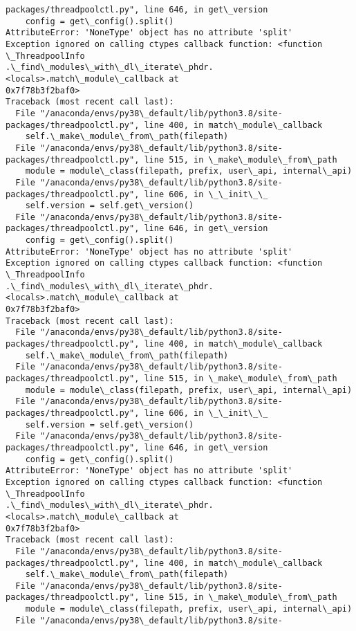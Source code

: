 \documentclass[11pt]{article}
\begin{document}
\begin{Verbatim}[commandchars=\\\{\}]
packages/threadpoolctl.py", line 646, in get\_version
    config = get\_config().split()
AttributeError: 'NoneType' object has no attribute 'split'
Exception ignored on calling ctypes callback function: <function \_ThreadpoolInfo
.\_find\_modules\_with\_dl\_iterate\_phdr.<locals>.match\_module\_callback at
0x7f78b3f2baf0>
Traceback (most recent call last):
  File "/anaconda/envs/py38\_default/lib/python3.8/site-
packages/threadpoolctl.py", line 400, in match\_module\_callback
    self.\_make\_module\_from\_path(filepath)
  File "/anaconda/envs/py38\_default/lib/python3.8/site-
packages/threadpoolctl.py", line 515, in \_make\_module\_from\_path
    module = module\_class(filepath, prefix, user\_api, internal\_api)
  File "/anaconda/envs/py38\_default/lib/python3.8/site-
packages/threadpoolctl.py", line 606, in \_\_init\_\_
    self.version = self.get\_version()
  File "/anaconda/envs/py38\_default/lib/python3.8/site-
packages/threadpoolctl.py", line 646, in get\_version
    config = get\_config().split()
AttributeError: 'NoneType' object has no attribute 'split'
Exception ignored on calling ctypes callback function: <function \_ThreadpoolInfo
.\_find\_modules\_with\_dl\_iterate\_phdr.<locals>.match\_module\_callback at
0x7f78b3f2baf0>
Traceback (most recent call last):
  File "/anaconda/envs/py38\_default/lib/python3.8/site-
packages/threadpoolctl.py", line 400, in match\_module\_callback
    self.\_make\_module\_from\_path(filepath)
  File "/anaconda/envs/py38\_default/lib/python3.8/site-
packages/threadpoolctl.py", line 515, in \_make\_module\_from\_path
    module = module\_class(filepath, prefix, user\_api, internal\_api)
  File "/anaconda/envs/py38\_default/lib/python3.8/site-
packages/threadpoolctl.py", line 606, in \_\_init\_\_
    self.version = self.get\_version()
  File "/anaconda/envs/py38\_default/lib/python3.8/site-
packages/threadpoolctl.py", line 646, in get\_version
    config = get\_config().split()
AttributeError: 'NoneType' object has no attribute 'split'
Exception ignored on calling ctypes callback function: <function \_ThreadpoolInfo
.\_find\_modules\_with\_dl\_iterate\_phdr.<locals>.match\_module\_callback at
0x7f78b3f2baf0>
Traceback (most recent call last):
  File "/anaconda/envs/py38\_default/lib/python3.8/site-
packages/threadpoolctl.py", line 400, in match\_module\_callback
    self.\_make\_module\_from\_path(filepath)
  File "/anaconda/envs/py38\_default/lib/python3.8/site-
packages/threadpoolctl.py", line 515, in \_make\_module\_from\_path
    module = module\_class(filepath, prefix, user\_api, internal\_api)
  File "/anaconda/envs/py38\_default/lib/python3.8/site-

\end{Verbatim}
\end{document}
